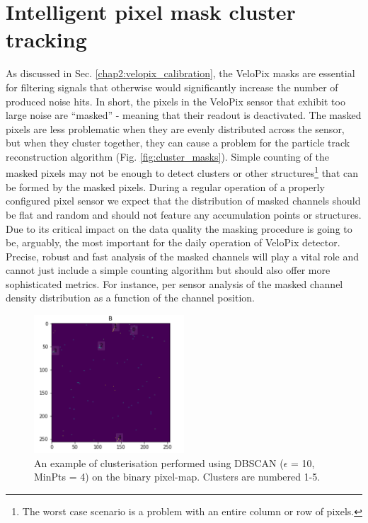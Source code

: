 \section{Intelligent pixel mask cluster tracking}
\label{sec:velopix-mask}
As discussed in Sec. \ref{chap2:velopix_calibration}, the VeloPix masks are essential for filtering signals that otherwise would significantly increase the number of produced noise hits.
In short, the pixels in the VeloPix sensor that exhibit too large noise are ``masked'' - meaning that their readout is deactivated.
The masked pixels are less problematic when they are evenly distributed across the sensor, but when
they cluster together, they can cause a problem for the particle track reconstruction algorithm (Fig. \ref{fig:cluster_masks}).
Simple counting of the masked pixels may not be enough to detect clusters or other structures\footnote{The worst case scenario is a problem with an entire column or row of pixels.} that can be formed by the masked pixels.
During a regular operation of a properly configured pixel sensor we expect that the distribution of masked channels should be flat and random and should not feature any accumulation points or structures. Due to its critical impact on the data quality the masking procedure is going to be, arguably, the most important for the daily operation of VeloPix detector. Precise, robust and fast analysis of the masked channels will play a vital role and cannot just include a simple counting algorithm but should also offer more sophisticated metrics. For instance, per sensor analysis of the masked channel density distribution as a function of the channel position. 

\begin{figure}[h]
\centering
\includegraphics[width=0.5\textwidth]{figures/chapter4/velopix_clusters/dbscan_clusters.png}
\caption{An example of clusterisation performed using DBSCAN ($\epsilon$ = 10, MinPts = 4) on the binary pixel-map. Clusters are numbered 1-5.}
\label{fig:dbscan_clusters}
\end{figure}


